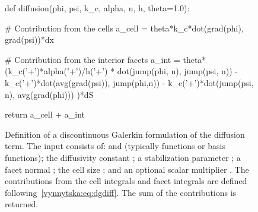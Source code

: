 \begin{figure}
    \begin{python}
def diffusion(phi, psi, k_c, alpha, n, h, theta=1.0):

    # Contribution from the cells
    a_cell = theta*k_c*dot(grad(phi), grad(psi))*dx

    # Contribution from the interior facets
    a_int = theta*(k_c('+')*alpha('+')/h('+')
                   * dot(jump(phi, n), jump(psi, n))
        - k_c('+')*dot(avg(grad(psi)), jump(phi,n))
        - k_c('+')*dot(jump(psi, n), avg(grad(phi)))
        )*dS

    return a_cell + a_int
    \end{python}
  \caption{Definition of a discontinuous Galerkin formulation of the
    diffusion term. The input consists of:  and 
    (typically functions or basis functions); the diffusivity
    constant ; a stabilization parameter ; a
    facet normal ; the cell size ; and an optional
    scalar multiplier . The contributions from the cell
    integrals and facet integrals are defined
    following~\eqref{vynnytska:eq:dgdiff}. The sum of the
    contributions is returned.}
  \label{vynnytska:fig:diffusion}
\end{figure}

